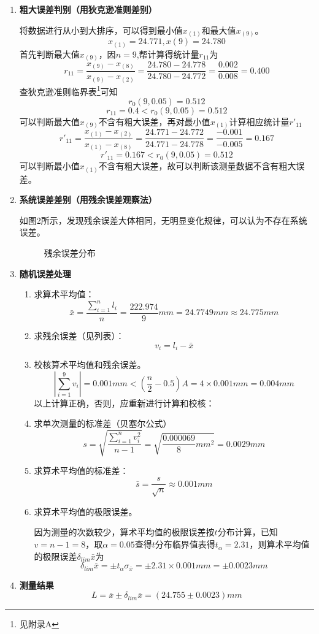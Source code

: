 \begin{enumerate}
	\item \textbf{粗大误差判别（用狄克逊准则差别）}
	
	\qquad 将数据进行从小到大排序，可以得到最小值$ x_{(1)} $和最大值$ x_{(9)} $。\[ x_{(1)}=24.771,x{(9)}=24.780 \]
	首先判断最大值$ x_{(9)} $，因$ n=9 $,帮计算得统计量$ r_{11} $为\[ r_{11}=\frac{x_{(9)}-x_{(8)}}{x_{(9)}-x_{(2)}}=\frac{24.780-24.778}{24.780-24.772}=\frac{0.002}{0.008}=0.400 \]
	查狄克逊准则临界表\footnote{见附录A}可知\[ r_0(9,0.05)=0.512 \]\[ r_{11}=0.4<r_0(9,0.05)=0.512 \]
	可以判断最大值$ x_{(9)} $不含有粗大误差，再对最小值$ x_{(1)} $计算相应统计量$ r'_{11} $
	\[ r'_{11}=\frac{x_{(1)}-x_{(2)}}{x_{(1)}-x_{(8)}}=\frac{24.771-24.772}{24.771-24.778}=\frac{-0.001}{-0.005}=0.167 \]
	\[ r'_{11}=0.167<r_0(9,0.05)=0.512 \]
	可以判断最小值$ x_{(1)} $不含有粗大误差，故可以判断该测量数据不含有粗大误差。
	\item \textbf{系统误差差别（用残余误差观察法）}
	
	\qquad 如图2所示，发现残余误差大体相同，无明显变化规律，可以认为不存在系统误差。
	\begin{figure}[H]
		\centering
		\caption{残余误差分布}
	\end{figure}

	\item \textbf{随机误差处理}
		\begin{enumerate}
			\item 求算术平均值：\[ \bar{x}=\frac{\sum\limits_{i=1}^{n}l_i}{n}=\frac{222.974}{9}mm=24.7749mm\approx24.775mm \]
			\item 求残余误差（见列表）：\[ v_i=l_i-\bar{x} \]
			\item 校核算术平均值和残余误差。\[ \left| \sum\limits_{i=1}^{9}v_i \right|=0.001mm<\left(\frac{n}{2}-0.5\right)A=4\times0.001mm=0.004mm  \]
			以上计算正确，否则，应重新进行计算和校核：
			\item 求单次测量的标准差（贝塞尔公式）\[ s=\sqrt{\frac{\sum\limits_{i=1}^{n}v_i^2}{n-1}}=\sqrt{\frac{0.000069}{8}mm^2}=0.0029mm \]
			\item 求算术平均值的标准差：\[ \bar{s}=\frac{s}{\sqrt{n}}\approx0.001mm \]
			\item 求算术平均值的极限误差。
			
			\qquad 因为测量的次数较少，算术平均值的极限误差按$ t $分布计算，已知$ v=n-1=8 $，取$ \alpha=0.05 $查得$ t $分布临界值表得$ t_\alpha=2.31 $，则算术平均值的极限误差$ \delta_{lim}\bar{x} $为\[ \delta_{lim}\bar{x}=\pm t_\alpha\sigma_{\bar{x}}=\pm2.31\times0.001mm=\pm0.0023mm \]
		\end{enumerate}
	\item \textbf{测量结果}\[ L=\bar{x}\pm\delta_{lim}\bar{x}=(24.755\pm0.0023)mm \]
\end{enumerate}
